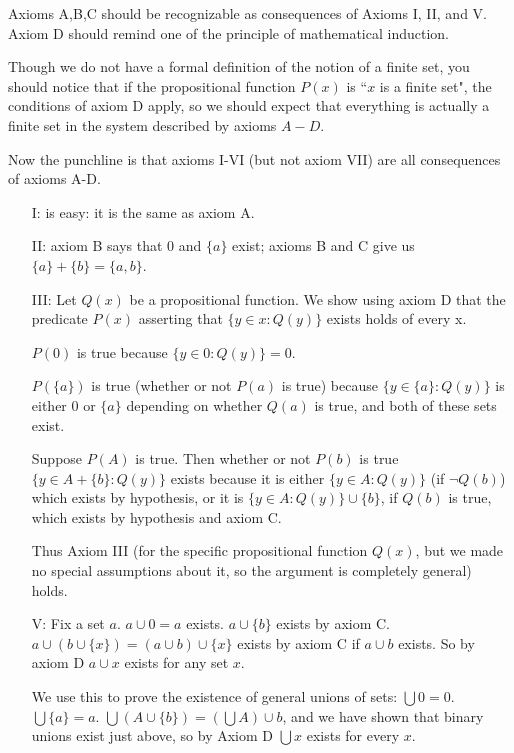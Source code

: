 \documentclass[12pt]{article}
\begin{document}
\begin{enumerate}
\begin{description}
Axioms A,B,C should be recognizable as consequences of Axioms I, II, and V.  Axiom D should remind one of the principle of mathematical induction.

Though we do not have a formal definition of the notion of a finite set, you should notice that if the propositional function $P(x)$ is ``$x$ is a finite set",
the conditions of axiom D apply, so we should expect that everything is actually a finite set in the system described by axioms $A-D$.

Now the punchline is that axioms I-VI (but not axiom VII) are all consequences of axioms A-D.

\begin{enumerate}

\item[I:] is easy:  it is the same as axiom A.

\item[II:]  axiom B says that 0 and $\{a\}$ exist;  axioms B and C give us $\{a\}+\{b\} = \{a,b\}$.

\item[III:] Let $Q(x)$ be a propositional function.  We show using axiom D that the predicate $P(x)$ asserting that $\{y \in x:Q(y)\}$ exists holds of every x.

$P(0)$ is true because $\{y \in 0:Q(y)\} = 0$.

$P(\{a\})$ is true (whether or not $P(a)$ is true) because $\{y \in \{a\}:Q(y)\}$ is either 0 or $\{a\}$ depending on whether $Q(a)$ is true,
and both of these sets exist.

Suppose $P(A)$ is true.  Then whether or not $P(b)$ is true $\{y \in A + \{b\}:Q(y)\}$ exists because it is either $\{y \in A:Q(y)\}$ (if $\neg Q(b)$) which
exists by hypothesis, or it is $\{y \in A:Q(y)\} \cup \{b\}$, if $Q(b)$ is true, which exists by hypothesis and axiom C.

Thus Axiom III (for the specific propositional function $Q(x)$, but we made no special assumptions about it, so the argument is completely general) holds.

\item[V:]  Fix a set $a$.  $a \cup 0 = a$ exists.  $a \cup \{b\}$ exists by axiom C.  $a \cup (b \cup \{x\}) = (a\cup b) \cup \{x\}$ exists by axiom C if $a \cup b$ exists.  So by axiom D
$a \cup x$ exists for any set $x$.  

We use this to prove the existence of general unions of sets:
$\bigcup 0=0$.  $\bigcup \{a\} = a$.  $\bigcup (A \cup \{b\}) = (\bigcup A) \cup b$, and we have shown that binary unions exist just above, so by Axiom D $\bigcup x$ exists for every $x$.


\end{enumerate}
\end{description}
\end{enumerate}
\end{document}
